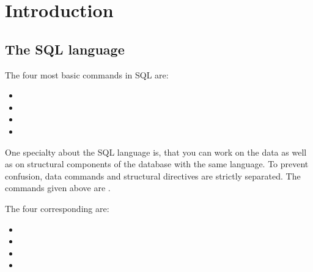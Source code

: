 %
%
%
\section{Introduction}

\subsection{The SQL language}

The four most basic commands in SQL are:

\begin{itemize}
    \item 
    \item 
    \item 
    \item 
\end{itemize}

One specialty about the SQL language is, that you can work on the data as well as on structural components of the database with the same language.
To prevent confusion, data commands and structural directives are strictly separated.
The commands given above are \blank. \medskip\par
% 
The four corresponding \blank are:

\begin{itemize}
    \item 
    \item 
    \item 
    \item 
\end{itemize}
